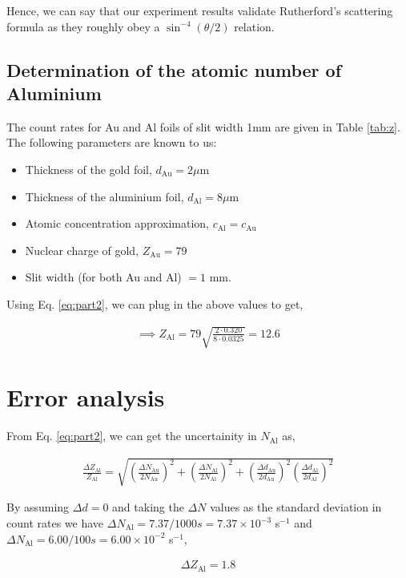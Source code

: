 Hence, we can say that our experiment results validate Rutherford's scattering formula as they roughly obey a $\sin^{-4}(\theta/2)$ relation.



\subsection{Determination of the atomic number of Aluminium}
The count rates for Au and Al foils of slit width 1mm are given in Table \ref{tab:z}. The following parameters are known to us:

\begin{itemize}
    \item Thickness of the gold foil, $d_\text{Au} = 2\mu$m
    \item Thickness of the aluminium foil, $d_\text{Al} = 8\mu$m
    \item Atomic concentration approximation, $c_\text{Al} = c_\text{Au}$
    \item Nuclear charge of gold, $Z_\text{Au} = 79$
    \item Slit width (for both Au and Al) $ = 1$ mm.
\end{itemize}

\noindent Using Eq. \ref{eq:part2}, we can plug in the above values to get,

\begin{align*}
    \implies Z_\text{Al} = 79\sqrt{\frac{2\cdot 0.320}{8 \cdot 0.0325}} = 12.6
\end{align*}


\section{Error analysis}

From Eq. \ref{eq:part2}, we can get the uncertainity in $N_\text{Al}$ as, 

\begin{align}
    \frac{\Delta Z_\text{Al}}{Z_\text{Al}} = \sqrt{\left(\frac{\Delta N_\text{Au}}{2N_\text{Au}}\right)^2+\left(\frac{\Delta N_\text{Al}}{2N_\text{Al}}\right)^2+\left(\frac{\Delta d_\text{Au}}{2d_\text{Au}}\right)^2\left(\frac{\Delta d_\text{Al}}{2d_\text{Al}}\right)^2}
\end{align}

By assuming $\Delta d=0$ and taking the $\Delta N$ values as the standard deviation in count rates we have $\Delta N_\text{Al} = 7.37/1000s = 7.37 \times 10^{-3}$ s$^{-1}$ and $\Delta N_\text{Al}= 6.00/100s = 6.00 \times 10^{-2}$ s$^{-1}$,

\begin{align*}
    \Delta Z_\text{Al} = 1.8
\end{align*}
